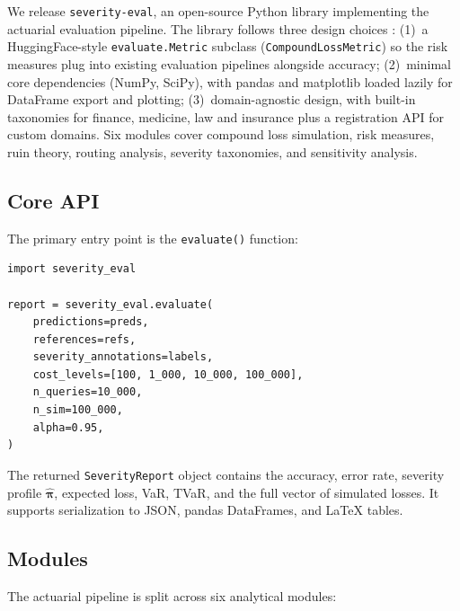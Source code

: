 \documentclass[11pt]{article}
\newcommand{\seveval}{\texttt{severity-eval}}
\newcommand{\bpi}{\boldsymbol{\pi}}
\begin{document}
We release \seveval{}, an open-source Python library implementing
the actuarial evaluation pipeline. The library follows three design
choices : (1)~a HuggingFace-style \texttt{evaluate.Metric} subclass
(\texttt{CompoundLossMetric}) so the risk measures plug into existing
evaluation pipelines alongside accuracy; (2)~minimal core
dependencies (NumPy, SciPy), with pandas and matplotlib loaded
lazily for DataFrame export and plotting; (3)~domain-agnostic
design, with built-in taxonomies for finance, medicine, law and
insurance plus a registration API for custom domains. Six modules
cover compound loss simulation, risk measures, ruin theory, routing
analysis, severity taxonomies, and sensitivity analysis.

\subsection{Core API}

The primary entry point is the \texttt{evaluate()} function:

\begin{small}
\begin{verbatim}
import severity_eval

report = severity_eval.evaluate(
    predictions=preds,
    references=refs,
    severity_annotations=labels,
    cost_levels=[100, 1_000, 10_000, 100_000],
    n_queries=10_000,
    n_sim=100_000,
    alpha=0.95,
)
\end{verbatim}
\end{small}

\noindent The returned \texttt{SeverityReport} object contains the
accuracy, error rate, severity profile $\hat{\bpi}$, expected loss,
VaR, TVaR, and the full vector of simulated losses. It supports
serialization to JSON, pandas DataFrames, and \LaTeX{} tables.

\subsection{Modules}

The actuarial pipeline is split across six analytical modules:
\end{document}
